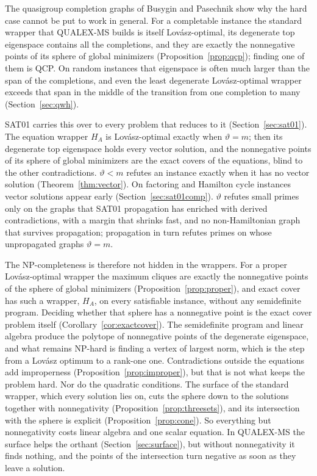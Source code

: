 \documentclass[11pt]{article}
\theoremstyle{definition}
\theoremstyle{remark}
\begin{document}
The quasigroup completion graphs of Busygin and Pasechnik \cite{BP03} show
why the hard case cannot be put to work in general. For a completable
instance the standard wrapper that QUALEX-MS builds is itself Lov\'asz-optimal,
its degenerate top eigenspace contains all the completions, and they are
exactly the nonnegative points of its sphere of global minimizers
(Proposition~\ref{prop:qcp}); finding one of them is QCP. On random
instances that eigenspace is often much larger than the span of the
completions, and even the least degenerate Lov\'asz-optimal wrapper exceeds
that span in the middle of the transition from one completion to many
(Section~\ref{sec:qwh}).

SAT01 \cite{Bu07} carries this over to every problem that reduces to it
(Section~\ref{sec:sat01}). The equation wrapper $H_A$ is Lov\'asz-optimal
exactly when $\vartheta=m$; then its degenerate top eigenspace holds every
vector solution, and the nonnegative points of its sphere of global
minimizers are the exact covers of the equations, blind to the other
contradictions. $\vartheta<m$ refutes an instance exactly when it has no
vector solution (Theorem~\ref{thm:vector}). On factoring and Hamilton cycle
instances vector solutions appear early (Section~\ref{sec:sat01comp}).
$\vartheta$ refutes small primes only on the graphs that SAT01 propagation
has enriched with derived contradictions, with a margin that shrinks fast,
and no non-Hamiltonian graph that survives propagation; propagation in turn
refutes primes on whose unpropagated graphs $\vartheta=m$.

The NP-completeness is therefore not hidden in the wrappers. For a proper
Lov\'asz-optimal wrapper the maximum cliques are exactly the nonnegative
points of the sphere of global minimizers (Proposition~\ref{prop:proper}),
and exact cover has such a wrapper, $H_A$, on every satisfiable instance,
without any semidefinite program. Deciding whether that sphere has a
nonnegative point is the exact cover problem itself
(Corollary~\ref{cor:exactcover}). The semidefinite program and linear algebra
produce the polytope of nonnegative points of the degenerate eigenspace,
and what remains NP-hard is finding a vertex of largest norm, which is the
step from a Lov\'asz optimum to a rank-one one. Contradictions outside the
equations add improperness (Proposition~\ref{prop:improper}), but that is
not what keeps the problem hard. Nor do the quadratic conditions. The
surface of the standard wrapper, which every solution lies on, cuts the
sphere down to the solutions together with nonnegativity
(Proposition~\ref{prop:threesets}), and its intersection with the sphere is
explicit (Proposition~\ref{prop:cone}). So everything but nonnegativity
costs linear algebra and one scalar equation. In QUALEX-MS the surface helps
the orthant (Section~\ref{sec:surface}), but without nonnegativity it finds
nothing, and the points of the intersection turn negative as soon as they
leave a solution.
\end{document}
